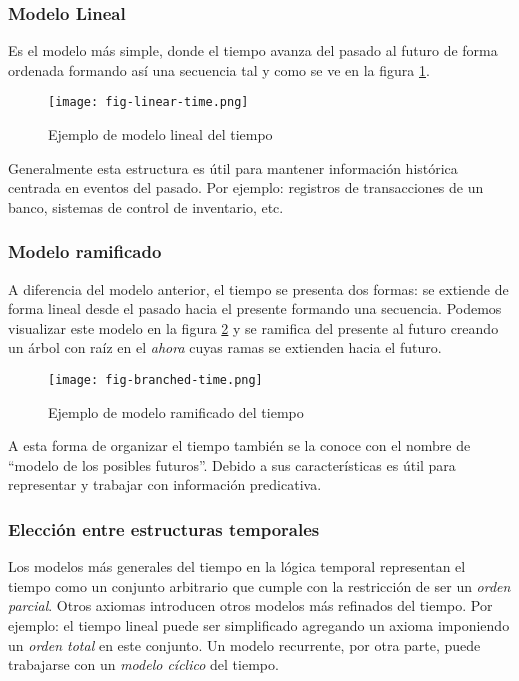 \subsubsection{Modelo Lineal}

Es el modelo más simple, donde el tiempo avanza del pasado al futuro de forma ordenada formando así una secuencia
tal y como se ve en la figura \ref{fig:linear-time-model}.

\begin{figure}
    \centering
    \texttt{[image: fig-linear-time.png]}
    \caption{Ejemplo de modelo lineal del tiempo}
    \label{fig:linear-time-model}
\end{figure}

Generalmente esta estructura es útil para mantener información histórica centrada en eventos del pasado.
Por ejemplo: registros de transacciones de un banco, sistemas de control de inventario, etc.

\subsubsection{Modelo ramificado}

A diferencia del modelo anterior, el tiempo se presenta dos formas:
se extiende de forma lineal desde el pasado hacia el presente formando una secuencia.
Podemos visualizar este modelo en la figura \ref{fig:branched-time-model}
y se ramifica del presente al futuro creando un árbol con raíz en el \textit{ahora} cuyas ramas se extienden hacia el futuro.

\begin{figure}
    \centering
    \texttt{[image: fig-branched-time.png]}
    \caption{Ejemplo de modelo ramificado del tiempo}
    \label{fig:branched-time-model}
\end{figure}

A esta forma de organizar el tiempo también se la conoce con el nombre de “modelo de los posibles futuros”.
Debido a sus características es útil para representar y trabajar con información predicativa.

\subsubsection{Elección entre estructuras temporales}

Los modelos más generales del tiempo en la lógica temporal representan el tiempo como un conjunto arbitrario
que cumple con la restricción de ser un \textit{orden parcial}.
Otros axiomas introducen otros modelos más refinados del tiempo.
Por ejemplo: el tiempo lineal puede ser simplificado agregando un axioma imponiendo un \textit{orden total} en este conjunto.
Un modelo recurrente, por otra parte, puede trabajarse con un \textit{modelo cíclico} del tiempo.

